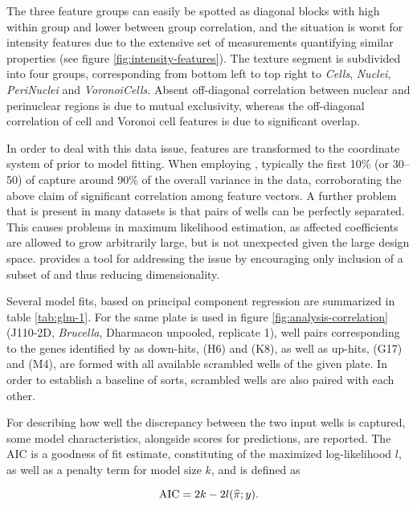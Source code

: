 The three feature groups can easily be spotted as diagonal blocks with high within group and lower between group correlation, and the situation is worst for intensity features due to the extensive set of measurements quantifying similar properties (see figure \ref{fig:intensity-features}). The texture segment is subdivided into four groups, corresponding from bottom left to top right to \textit{Cells}, \textit{Nuclei}, \textit{PeriNuclei} and \textit{VoronoiCells}. Absent off-diagonal correlation between nuclear and perinuclear regions is due to mutual exclusivity, whereas the off-diagonal correlation of cell and Voronoi cell features is due to significant overlap.



In order to deal with this data issue, features are transformed to the coordinate system of  prior to  model fitting. When employing , typically the first 10\% (or 30--50) of  capture around 90\% of the overall variance in the data, corroborating the above claim of significant correlation among feature vectors. A further problem that is present in many datasets is that pairs of wells can be perfectly separated. This causes problems in maximum likelihood estimation, as affected coefficients are allowed to grow arbitrarily large, but is not unexpected given the large design space.  provides a tool for addressing the issue by encouraging only inclusion of a subset of  and thus reducing dimensionality.

Several  model fits, based on principal component regression are summarized in table \ref{tab:glm-1}. For the same plate is used in figure \ref{fig:analysis-correlation} (J110-2D, \textit{Brucella}, Dharmacon unpooled, replicate 1), well pairs corresponding to the genes identified by  as down-hits,  (H6) and  (K8), as well as up-hits,  (G17) and  (M4), are formed with all available scrambled wells of the given plate. In order to establish a baseline of sorts, scrambled wells are also paired with each other.

For describing how well the discrepancy between the two input wells is captured, some model characteristics, alongside scores for predictions, are reported. The AIC is a goodness of fit estimate, constituting of the maximized log-likelihood $l$, as well as a penalty term for model size $k$, and is defined as

\begin{equation}
  \operatorname{AIC} = 2k - 2l(\widehat{\pi}; y).
\end{equation}

